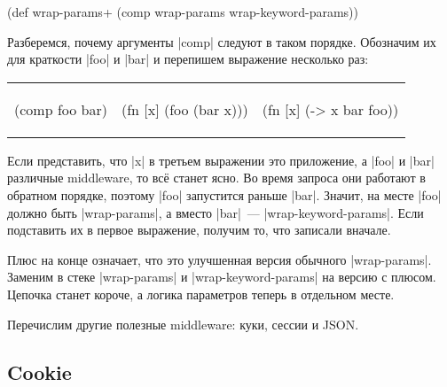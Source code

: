 \begin{english}
  \begin{clojure}
(def wrap-params+ (comp wrap-params wrap-keyword-params))
  \end{clojure}
\end{english}

Разберемся, почему аргументы \spverb|comp| следуют в таком порядке. Обозначим их
для краткости \spverb|foo| и \spverb|bar| и перепишем выражение несколько раз:

\noindent
\begin{tabular}{ @{}p{3cm} @{}p{3.5cm} @{}p{3.5cm} }

\begin{english}
  \begin{clojure}
(comp foo bar)
  \end{clojure}
\end{english}

&

\begin{english}
  \begin{clojure}
(fn [x]
  (foo (bar x)))
  \end{clojure}
\end{english}

&

\begin{english}
  \begin{clojure}
(fn [x] (-> x
            bar
            foo))
  \end{clojure}
\end{english}

\end{tabular}

Если представить, что \spverb|x| в третьем выражении это приложение, а
\spverb|foo| и \spverb|bar| различные middleware, то вс\"{е} станет ясно. Во время
запроса они работают в обратном порядке, поэтому \spverb|foo| запустится раньше
\spverb|bar|. Значит, на месте \spverb|foo| должно быть \spverb|wrap-params|, а
вместо \spverb|bar|~--- \spverb|wrap-keyword-params|. Если подставить их в
первое выражение, получим то, что записали вначале.

Плюс на конце означает, что это улучшенная версия обычного
\spverb|wrap-params|. Заменим в стеке \spverb|wrap-params| и
\spverb|wrap-keyword-params| на версию с плюсом. Цепочка станет короче, а логика
параметров теперь в отдельном месте.

Перечислим другие полезные middleware: куки, сессии и JSON.

\subsection{Cookie}


